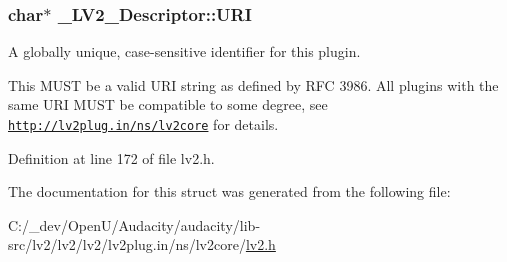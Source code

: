 \subsubsection[{\texorpdfstring{U\+RI}{URI}}]{ char$\ast$ \+\_\+\+L\+V2\+\_\+\+Descriptor\+::\+U\+RI}\hypertarget{struct___l_v2___descriptor_a4d26065676fcaaf06ba1fb242de0fc72}{}\label{struct___l_v2___descriptor_a4d26065676fcaaf06ba1fb242de0fc72}
A globally unique, case-\/sensitive identifier for this plugin.

This M\+U\+ST be a valid U\+RI string as defined by R\+FC 3986. All plugins with the same U\+RI M\+U\+ST be compatible to some degree, see \href{http://lv2plug.in/ns/lv2core}{\tt http\+://lv2plug.\+in/ns/lv2core} for details. 

Definition at line 172 of file lv2.\+h.



The documentation for this struct was generated from the following file\+:\begin{DoxyCompactItemize}
\item 
C\+:/\+\_\+dev/\+Open\+U/\+Audacity/audacity/lib-\/src/lv2/lv2/lv2/lv2plug.\+in/ns/lv2core/\hyperlink{lv2_8h}{lv2.\+h}\end{DoxyCompactItemize}
